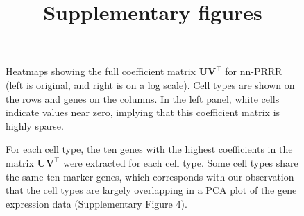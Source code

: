 \documentclass{bmcart}
\begin{document}
\title{Supplementary figures}
\date{\vspace{-3ex}}
\maketitle

\begin{figure}
  \centering
  \caption{}
  \label{sub:graphical_model_multimodality}
\end{figure}

\begin{figure}%
\centering
\caption{ Heatmaps showing the full coefficient matrix $\mathbf{U} \mathbf{V}^\top$ for nn-PRRR (left is original, and right is on a log scale). Cell types are shown on the rows and genes on the columns. In the left panel, white cells indicate values near zero, implying that this coefficient matrix is highly sparse.}
\label{fig:pancreas_nn-prrr_coeffs}
\end{figure}

\begin{figure}%
\centering
\caption{ For each cell type, the ten genes with the highest coefficients in the matrix $\mathbf{U} \mathbf{V}^\top$ were extracted for each cell type. Some cell types share the same ten marker genes, which corresponds with our observation that the cell types are largely overlapping in a PCA plot of the gene expression data (Supplementary Figure 4).} %
\label{fig:pancreas_marker_genes_table}
\end{figure}
\end{document}

